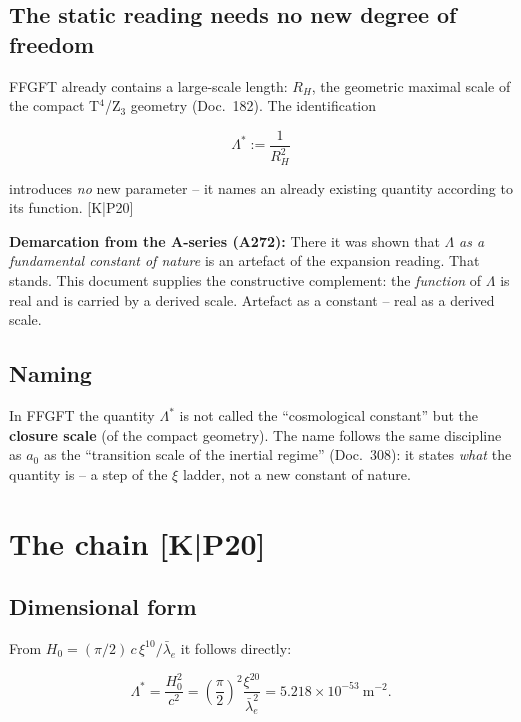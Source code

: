 \documentclass[11pt]{report}
\begin{document}
\section{The static reading needs no new degree of freedom}

FFGFT already contains a large-scale length: $R_H$, the geometric
maximal scale of the compact T$^4$/Z$_3$ geometry (Doc.~182). The
identification

\begin{equation}
  \Lambda^{*} := \frac{1}{R_H^2}
  \label{eq:def}
\end{equation}

introduces \emph{no} new parameter -- it names an already existing
quantity according to its function. [K|P20]

\textbf{Demarcation from the A-series (A272):} There it was shown
that $\Lambda$ \emph{as a fundamental constant of nature} is an
artefact of the expansion reading. That stands. This document
supplies the constructive complement: the \emph{function} of
$\Lambda$ is real and is carried by a derived scale. Artefact as a
constant -- real as a derived scale.

\section{Naming}

In FFGFT the quantity $\Lambda^{*}$ is not called the
\enquote{cosmological constant} but the \textbf{closure scale} (of
the compact geometry). The name follows the same discipline as
$a_0$ as the \enquote{transition scale of the inertial regime}
(Doc.~308): it states \emph{what} the quantity is -- a step of the
$\xi$ ladder, not a new constant of nature.

\chapter{The chain [K|P20]}

\section{Dimensional form}

From $H_0 = (\pi/2)\,c\,\xi^{10}/\bar\lambda_e$ it follows directly:

\begin{equation}
  \Lambda^{*}
  = \frac{H_0^2}{c^2}
  = \left(\frac{\pi}{2}\right)^{2}\frac{\xi^{20}}{\bar\lambda_e^{2}}
  = 5.218\times10^{-53}~\text{m}^{-2}.
  \label{eq:chain}
\end{equation}
\end{document}
